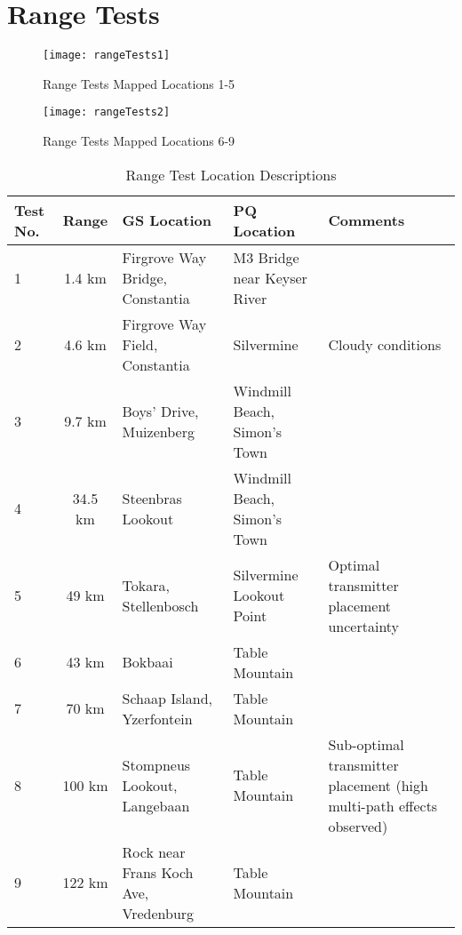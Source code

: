 \section{Range Tests}\label{sec:appendix_range}
\begin{figure}[!htb]
  \centering
  \texttt{[image: rangeTests1]}
  \caption{Range Tests Mapped Locations 1-5}
  \label{fig:rangeTests1}
\end{figure}
\begin{figure}[!htb]
  \centering
  \texttt{[image: rangeTests2]}
  \caption{Range Tests Mapped Locations 6-9}
  \label{fig:rangeTests2}
\end{figure}
\begin{table}[!htb]
  \centering
  \renewcommand{\arraystretch}{1.2}
  \begin{tabular}{ |p{1cm}|c|p{4cm}|p{4cm}|p{3cm}| }
  \hline
  \textbf{Test No.}         & \textbf{Range}        & \textbf{GS Location}      & \textbf{PQ Location}      & \textbf{Comments} \\ 
  \hline
  1                         
  & 1.4 km  
  & Firgrove Way Bridge, Constantia
  & M3 Bridge near Keyser River
  & \\ \hline
  2
  & 4.6 km  
  & Firgrove Way Field, Constantia
  & Silvermine
  & Cloudy conditions \\ \hline
  3
  & 9.7 km  
  & Boys' Drive, Muizenberg
  & Windmill Beach, Simon's Town
  & \\ \hline
  4
  & 34.5 km  
  & Steenbras Lookout
  & Windmill Beach, Simon's Town
  & \\ \hline
  5
  & 49 km  
  & Tokara, Stellenbosch  
  & Silvermine Lookout Point
  & Optimal transmitter placement uncertainty \\ \hline
  6
  & 43 km  
  & Bokbaai
  & Table Mountain
  & \\ \hline
  7
  & 70 km  
  & Schaap Island, Yzerfontein
  & Table Mountain
  & \\ \hline
  8
  & 100 km  
  & Stompneus Lookout, Langebaan
  & Table Mountain
  & Sub-optimal transmitter placement (high multi-path effects observed) \\ \hline
  9
  & 122 km  
  & Rock near Frans Koch Ave, Vredenburg
  & Table Mountain
  & \\ \hline
  \end{tabular}
  \caption{Range Test Location Descriptions}
  \label{tab:rangeTestLocations}
\end{table}

